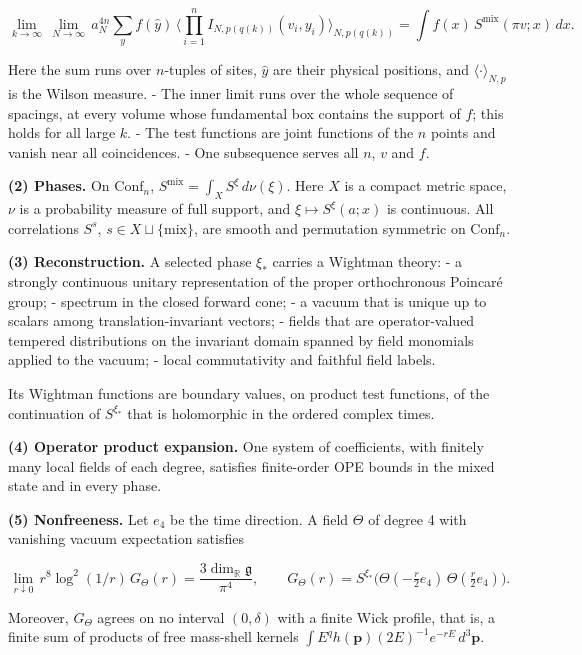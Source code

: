 \documentclass[
  letterpaper,
  11pt]{article}
\begin{document}
\[\lim_{k\to\infty}\,\lim_{N\to\infty}\,a_N^{4n}\sum_{y}f(\hat y)\,\Big\langle\prod_{i=1}^nI_{N,p(q(k))}(v_i,y_i)\Big\rangle_{N,p(q(k))}=\int f(x)\,S^{\mathrm{mix}}(\pi v;x)\,dx .\]

Here the sum runs over \(n\)-tuples of sites, \(\hat y\) are their
physical positions, and \(\langle\cdot\rangle_{N,p}\) is the Wilson
measure. - The inner limit runs over the whole sequence of spacings, at
every volume whose fundamental box contains the support of \(f\); this
holds for all large \(k\). - The test functions are joint functions of
the \(n\) points and vanish near all coincidences. - One subsequence
serves all \(n\), \(v\) and \(f\).

\textbf{(2) Phases.} On \(\mathrm{Conf}_n\),
\(S^{\mathrm{mix}}=\int_XS^\xi\,d\nu(\xi)\). Here \(X\) is a compact
metric space, \(\nu\) is a probability measure of full support, and
\(\xi\mapsto S^\xi(a;x)\) is continuous. All correlations \(S^s\),
\(s\in X\sqcup\lbrace\mathrm{mix}\rbrace\), are smooth and permutation
symmetric on \(\mathrm{Conf}_n\).

\textbf{(3) Reconstruction.} A selected phase \(\xi_\ast\) carries a
Wightman theory: - a strongly continuous unitary representation of the
proper orthochronous Poincaré group; - spectrum in the closed forward
cone; - a vacuum that is unique up to scalars among
translation-invariant vectors; - fields that are operator-valued
tempered distributions on the invariant domain spanned by field
monomials applied to the vacuum; - local commutativity and faithful
field labels.

Its Wightman functions are boundary values, on product test functions,
of the continuation of \(S^{\xi_\ast}\) that is holomorphic in the
ordered complex times.

\textbf{(4) Operator product expansion.} One system of coefficients,
with finitely many local fields of each degree, satisfies finite-order
OPE bounds in the mixed state and in every phase.

\textbf{(5) Nonfreeness.} Let \(e_4\) be the time direction. A field
\(\Theta\) of degree 4 with vanishing vacuum expectation satisfies

\[\lim_{r\downarrow0}\,r^8\log^2(1/r)\,G_\Theta(r)=\frac{3\dim_{\mathbb R}\mathfrak g}{\pi^4},\qquad G_\Theta(r)=S^{\xi_\ast}\big(\Theta(-\tfrac r2e_4)\,\Theta(\tfrac r2e_4)\big).\]

Moreover, \(G_\Theta\) agrees on no interval \((0,\delta)\) with a
finite Wick profile, that is, a finite sum of products of free
mass-shell kernels
\(\int E^q h(\mathbf p)(2E)^{-1}e^{-rE}\,d^3\mathbf p\).
\end{document}

